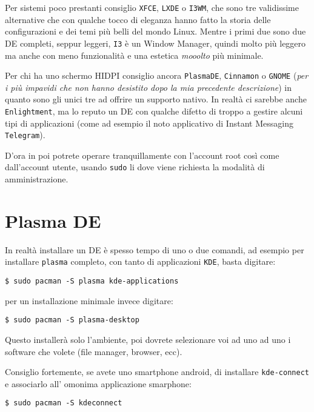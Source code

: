 \documentclass[twoside,italian]{book}
\newcommand{\code}[1]{\texttt{#1}}
\begin{document}
Per sistemi poco prestanti consiglio \code{XFCE}, \code{LXDE} o \code{I3WM}, che sono tre validissime alternative che con qualche tocco di eleganza hanno fatto la storia delle configurazioni e dei temi più belli del mondo Linux. Mentre i primi due sono due \ac{DE} completi, seppur leggeri, \code{I3} è un Window Manager, quindi molto più leggero ma anche con meno funzionalità e una estetica \emph{mooolto} più minimale.

Per chi ha uno schermo HIDPI consiglio ancora \code{PlasmaDE}, \code{Cinnamon} o \code{GNOME} (\emph{per i più impavidi che non hanno desistito dopo la mia precedente descrizione}) in quanto sono gli unici tre ad offrire un supporto nativo. In realtà ci sarebbe anche \code{Enlightment}, ma lo reputo un \ac{DE} con qualche difetto di troppo a gestire alcuni tipi di applicazioni (come ad esempio il noto applicativo di Instant Messaging \code{Telegram}).

\begin{tcolorbox}[floatplacement=b,width=\textwidth,title={NOTA BENE:}, colback={lightgray},colbacktitle=gray,coltitle=white,colupper=black]
D'ora in poi potrete operare tranquillamente con l'account root così come dall'account utente, usando \code{sudo} li dove viene richiesta la modalità di amministrazione.
\end{tcolorbox}

\section{Plasma \ac{DE}}

    In realtà installare un \ac{DE} è spesso tempo di uno o due comandi, ad esempio per installare \code{plasma} completo, con tanto di applicazioni \code{KDE}, basta digitare:
    \begin{lstlisting}
$ sudo pacman -S plasma kde-applications
    \end{lstlisting}
    per un installazione minimale invece digitare:
    \begin{lstlisting}
$ sudo pacman -S plasma-desktop
    \end{lstlisting}
    Questo installerà solo l'ambiente, poi dovrete selezionare voi ad uno ad uno i software che volete (file manager, browser, ecc).

    Consiglio fortemente, se avete uno smartphone android, di installare \code{kde-connect} e associarlo all' omonima applicazione smarphone:
    \begin{lstlisting}
$ sudo pacman -S kdeconnect
    \end{lstlisting}
    
\end{document}
